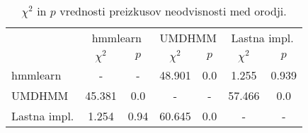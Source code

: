\begin{table}
\centering
  \begin{tabular}{l cc cc cc}
    \toprule\multirow{2}{*}{}
      & \multicolumn{2}{c}{hmmlearn} & \multicolumn{2}{c}{UMDHMM} & \multicolumn{2}{c}{Lastna impl.} \\
      & $\chi^2$ & $p$ & $\chi^2$ & $p$ & $\chi^2$ & $p$ \\ \midrule
    hmmlearn & - & - & 48.901 & 0.0 & 1.255 & 0.939 \\
    UMDHMM & 45.381 & 0.0 & - & - & 57.466 & 0.0 \\
    Lastna impl. & 1.254 & 0.94 & 60.645 & 0.0 & - & - \\ \bottomrule
  \end{tabular}
\caption{$\chi^2$ in $p$ vrednosti preizkusov neodvisnosti med orodji.}
\label{tab:bench:nxn_comparison}
\end{table}
